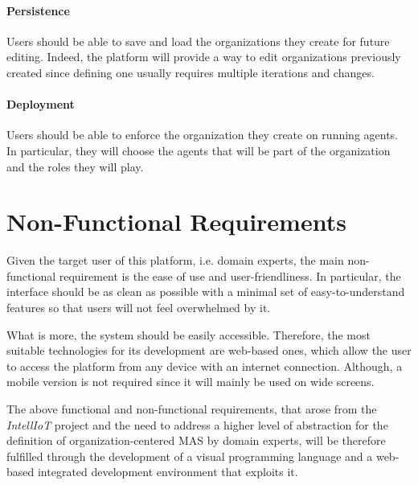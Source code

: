 \paragraph{Persistence}{
    Users should be able to save and load the organizations they create for future editing.
    Indeed, the platform will provide a way to edit organizations previously created since defining one usually requires multiple iterations and changes.
}

\paragraph{Deployment}{
    Users should be able to enforce the organization they create on running agents.
    In particular, they will choose the agents that will be part of the organization and the roles they will play.
}

\section{Non-Functional Requirements}
Given the target user of this platform, i.e. domain experts, the main non-functional requirement is the ease of use and user-friendliness.
In particular, the interface should be as clean as possible with a minimal set of easy-to-understand features so that users will not feel overwhelmed by it.

What is more, the system should be easily accessible.
Therefore, the most suitable technologies for its development are web-based ones, which allow the user to access the platform from any device with an internet connection.
Although, a mobile version is not required since it will mainly be used on wide screens.

The above functional and non-functional requirements, that arose from the \textit{IntellIoT} project and the need to address a higher level of abstraction for the definition of organization-centered MAS by domain experts, will be therefore fulfilled through the development of a visual programming language and a web-based integrated development environment that exploits it.